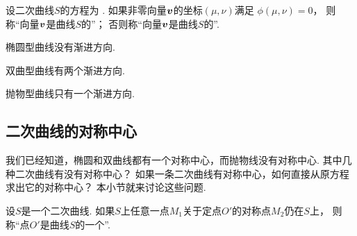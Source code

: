 \begin{definition}
设二次曲线\(S\)的方程为 .
如果非零向量\(\boldsymbol{v}\)的坐标\((\mu,\nu)\)满足
\(\phi(\mu,\nu) = 0\)，
则称“向量\(\boldsymbol{v}\)是曲线\(S\)的”；
否则称“向量\(\boldsymbol{v}\)是曲线\(S\)的”.
\end{definition}

\begin{theorem}
椭圆型曲线没有渐进方向.
\end{theorem}

\begin{theorem}
双曲型曲线有两个渐进方向.
\end{theorem}

\begin{theorem}
抛物型曲线只有一个渐进方向.
\end{theorem}

\subsection{二次曲线的对称中心}
我们已经知道，椭圆和双曲线都有一个对称中心，而抛物线没有对称中心.
其中几种二次曲线有没有对称中心？
如果一条二次曲线有对称中心，如何直接从原方程求出它的对称中心？
本小节就来讨论这些问题.

\begin{definition}
设\(S\)是一个二次曲线.
如果\(S\)上任意一点\(M_1\)关于定点\(O'\)的对称点\(M_2\)仍在\(S\)上，
则称“点\(O'\)是曲线\(S\)的一个”.
\end{definition}

